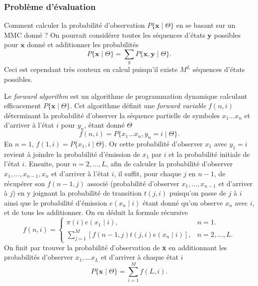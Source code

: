 \documentclass[a4paper, 11pt]{article}
\newcommand{\pinit}{\pi (i)}
\begin{document}
\subsubsection{Problème d'évaluation}
Comment calculer la probabilité d'observation $P\{\textbf{x}\mid \Theta\}$ en se basant sur un MMC donné ? On pourrait considérer toutes les séquences d'états $\textbf{y}$ possibles pour $\textbf{x}$ donné et additionner les probabilités 
\begin{equation}
P\{\textbf{x}\mid \Theta\} = \sum_{y}P\{\textbf{x},\textbf{y}\mid \Theta\}.
\end{equation}
Ceci est cependant très couteux en calcul puisqu'il existe $M^L$ séquences d'états possibles.
\\
\par
Le \textit{forward algorithm} est un algorithme de programmation dynamique calculant efficacement $P\{\textbf{x}\mid \Theta\}$. Cet algorithme définit une \textit{forward variable} $f(n,i) $ déterminant la probabilité d'observer la séquence partielle de symboles $x_1\dotsc x_n$ et d'arriver à l'état $i$ pour $y_n$, étant donné $\Theta$
\begin{equation}
f(n,i) = P\{x_1\dotsc x_n,y_n=i\mid \Theta\}.
\end{equation}
En $n=1$, $f(1,i) = P\{x_1,i\mid \Theta\}$. Or cette probabilité d'observer $x_1$ avec $y_1 =i$ revient à joindre la probabilité d'émission de $x_1$ par $i$ et la probabilité initiale de l'état $i$. Ensuite, pour $n=2,\dotsc ,L$, afin de calculer la probabilité d'observer $x_1,\dotsc ,x_{n-1},x_{n}$ et d'arriver à l'état $i$, il suffit, pour chaque $j$ en $n-1$, de récupérer son $f(n-1,j)$ associé (probabilité d'observer $x_1,\dotsc ,x_{n-1}$ et d'arriver à $j$) en y joignant la probabilité de transition $t(j,i)$ puisqu'on passe de $j$ à $i$ ainsi que le probabilité d'émission $e(x_{n}\mid i)$ étant donné qu'on observe $x_{n}$ avec $i$, et de tous les additionner. On en déduit la formule récursive
\begin{equation}
f(n,i) = \begin{cases}
	\pinit e(x_1\mid i), & n=1.\\ 
	\sum_{j=1}^{M}[f(n-1,j)t(j,i)e(x_{n}\mid i)], & n=2,\dotsc ,L.
\end{cases}
\end{equation}
On finit par trouver la probabilité d'observation de \textbf{x} en additionnant les probabilités d'observer $x_1,\dotsc x_L$ et d'arriver à chaque état $i$ 
\begin{equation}
P\{\textbf{x}\mid \Theta\} = \sum_{i=1}^{M}f(L,i).
\end{equation}
\end{document}
